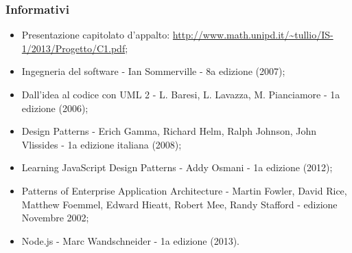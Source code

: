 		\subsubsection{Informativi}
		
		\begin{itemize}
		\item Presentazione capitolato d'appalto: \url{http://www.math.unipd.it/~tullio/IS-1/2013/Progetto/C1.pdf};
		\item Ingegneria del software - Ian Sommerville - 8a edizione (2007);
		\item Dall’idea al codice con UML 2 - L. Baresi, L. Lavazza, M. Pianciamore - 1a edizione
(2006);
		\item Design Patterns - Erich Gamma, Richard Helm, Ralph Johnson, John Vlissides - 1a edizione italiana (2008);
		\item Learning JavaScript Design Patterns - Addy Osmani - 1a edizione (2012);
		\item Patterns of Enterprise Application Architecture - Martin Fowler, David Rice, Matthew Foemmel, Edward Hieatt, Robert Mee, Randy Stafford - edizione Novembre 2002;
		\item Node.js - Marc Wandschneider - 1a edizione (2013).
		
		\end{itemize}
		
	\pagebreak
